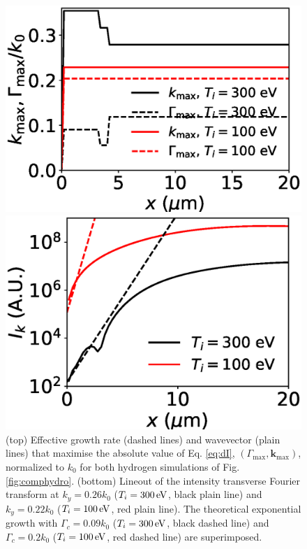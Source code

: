 \documentclass[
 reprint,
 superscriptaddress,
 amsmath,amssymb,
 aps,
]{revtex4-1}
\begin{document}
\begin{figure}

\includegraphics[width=0.99\columnwidth]{comp_kmax_gmax.eps}

\includegraphics[width=0.99\columnwidth]{gmax_eff.eps}

\caption{ \label{fig:geff} 
(top) Effective growth rate (dashed lines) and wavevector (plain lines) that maximise the absolute value of Eq.  \eqref{eq:dI}, $(\Gamma_\mathrm{max},\mathbf{k}_\mathrm{max})$,  normalized to $k_0$ for both hydrogen simulations of Fig. \ref{fig:comphydro}.
(bottom) Lineout of the intensity transverse Fourier transform at $k_y = 0.26k_0$ ($T_i=300\, \rm eV$, black plain line)  and $k_y = 0.22k_0$ ($T_i=100\, \rm eV$, red plain line). The theoretical exponential growth with $\Gamma_c=0.09k_0$ ($T_i=300\, \rm eV$, black dashed line) and $\Gamma_c=0.2k_0$ ($T_i=100\, \rm eV$, red dashed line) are superimposed. 
}
\end{figure}
\end{document}
